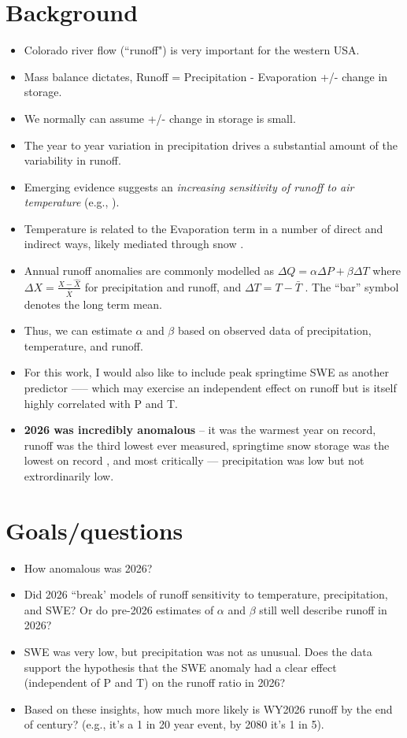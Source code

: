 \documentclass[draft]{agujournal2019}
\begin{document}
\section{Background}
\begin{itemize}
\item Colorado river flow (``runoff") is very important for the western USA.
\item Mass balance dictates, Runoff = Precipitation  - Evaporation +/- change in storage.
\item We normally can assume +/- change in storage is small. 
\item The year to year variation in precipitation drives a substantial amount of the variability in runoff.
\item Emerging evidence suggests an \textit{increasing sensitivity of runoff to air temperature} (e.g., ).
\item Temperature is related to the Evaporation term in a number of direct and indirect ways, likely mediated through snow \cite{Milly2018-yo, Milly2020-nk}.
\item Annual runoff anomalies are commonly modelled as $\Delta Q = \alpha \Delta P + \beta \Delta T$ where $\Delta X = \frac{X-\hat{X}}{\bar{X}}$ for precipitation and runoff, and $\Delta T= T - \bar{T}$ \cite{Lehner2017-se, Milly2020-nk}. The ``bar'' symbol denotes the long term mean.
\item Thus, we can estimate $\alpha$ and $\beta$ based on observed data of precipitation, temperature, and runoff. 
\item For this work, I would also like to include peak springtime SWE as another predictor —-- which may exercise an independent effect on runoff but is itself highly correlated with P and T. 
\item \textbf{2026 was incredibly anomalous} -- it was the warmest year on record, runoff was the third lowest ever measured, springtime snow storage was the lowest on record \cite{Marshall2026-sy}, and most critically — precipitation was low but not extrordinarily low.

\end{itemize}


\section{Goals/questions}

\begin{itemize}
\item How anomalous was 2026?
\item Did 2026 ``break' models of runoff sensitivity to temperature, precipitation, and SWE? Or do pre-2026 estimates of $\alpha$ and $\beta$ still well describe runoff in 2026?
\item SWE was very low, but precipitation was not as unusual. Does the data support the hypothesis that the SWE anomaly had a clear effect (independent of P and T) on the runoff ratio in 2026?
\item Based on these insights, how much more likely is WY2026 runoff by the end of century? (e.g., it's a 1 in 20 year event, by 2080 it's 1 in 5).  
\end{itemize}
\end{document}
